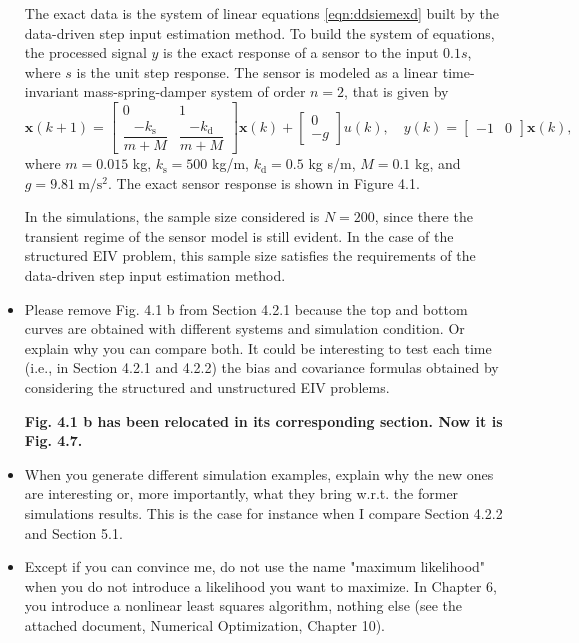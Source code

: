 \documentclass[11pt]{article}
\begin{document}
\begin{itemize}
    The exact data is the system of linear equations \ref{eqn:ddsiemexd} built by the data-driven step input estimation method.
    To build the system of equations, the processed signal ${y}$ is the exact response of a sensor to the input $0.1s$, where $s$ is the unit step response.  
    The sensor is modeled as a linear time-invariant mass-spring-damper system of order $n = 2$, that is given by 
    \begin{equation} \tag{4.37}
    \mathbf{x}(k+1) = \begin{bmatrix} 0 & 1 \\ \dfrac{-k_{\mathrm{s}}}{m+M} & \dfrac{-k_{\mathrm{d}}}{m+M} \end{bmatrix} \mathbf{x}(k) + \begin{bmatrix} 0\\ -g\end{bmatrix} u(k),  
    \quad y(k) = \begin{bmatrix} -1 & 0 \end{bmatrix} \mathbf{x}(k), \label{eqn:msdst}
    \end{equation}
    where $m=0.015$ kg, $k_{\mathrm{s}}=500$ kg/m, $k_{\mathrm{d}}=0.5$ kg s/m, $M=0.1$ kg, and $g=9.81 \ \mathrm{m/s^2}$.   
    The exact sensor response is shown in Figure 4.1.

    In the simulations, the sample size considered is $N=200$, since there the transient regime of the sensor model is still evident. 
    In the case of the structured EIV problem, this sample size satisfies the requirements of the data-driven step input estimation method. 
    \color{black}

    
    \item Please remove Fig. 4.1 b from Section 4.2.1 because the top and bottom curves are obtained with different systems and simulation condition. Or explain why you can compare both. It could be interesting to test each time (i.e., in Section 4.2.1 and 4.2.2) the bias and covariance formulas obtained by considering the structured and unstructured EIV problems. 
    
    {\bfseries Fig. 4.1 b has been relocated in its corresponding section. Now it is Fig. 4.7.}
    
    \item  When you generate different simulation examples, explain why the new ones are interesting or, more importantly, what they bring w.r.t. the former simulations results. This is the case for instance when I compare Section 4.2.2 and Section 5.1. 
    \item Except if you can convince me, do not use the name "maximum likelihood" when you do not introduce a likelihood you want to maximize. In Chapter 6, you introduce a nonlinear least squares algorithm, nothing else (see the attached document, Numerical Optimization, Chapter 10).
    

\end{itemize}
\end{document}
